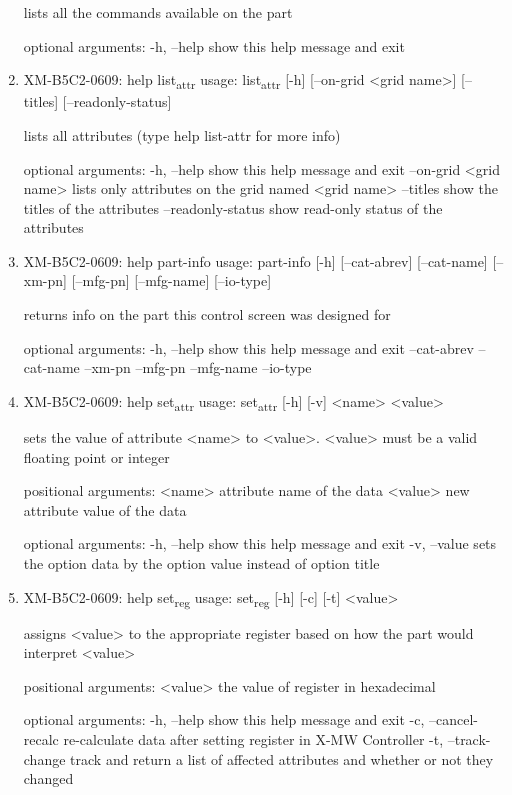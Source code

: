 \documentclass[11pt]{article}
\begin{document}
\begin{enumerate}
lists all the commands available on the part

optional arguments:
  -h, --help  show this help message and exit

\item XM-B5C2-0609: help list\textsubscript{attr}
\label{sec:orgfaa3866}
usage: list\textsubscript{attr} [-h] [--on-grid <grid name>] [--titles] [--readonly-status]

lists all attributes (type help list-attr for more info)

optional arguments:
  -h, --help            show this help message and exit
  --on-grid <grid name>
                        lists only attributes on the grid named <grid name>
  --titles              show the titles of the attributes
  --readonly-status     show read-only status of the attributes

\item XM-B5C2-0609: help part-info
\label{sec:org0cb66e5}
usage: part-info  [-h] [--cat-abrev] [--cat-name] [--xm-pn] [--mfg-pn] [--mfg-name]
        [--io-type]

returns info on the part this control screen was designed for

optional arguments:
  -h, --help   show this help message and exit
  --cat-abrev
  --cat-name
  --xm-pn
  --mfg-pn
  --mfg-name
  --io-type

\item XM-B5C2-0609: help set\textsubscript{attr}
\label{sec:orgaf9ae00}
usage: set\textsubscript{attr} [-h] [-v] <name> <value>

sets the value of attribute <name> to <value>. <value> must be a valid
floating point or integer

positional arguments:
  <name>       attribute name of the data
  <value>      new attribute value of the data

optional arguments:
  -h, --help   show this help message and exit
  -v, --value  sets the option data by the option value instead of option
               title

\item XM-B5C2-0609: help set\textsubscript{reg}
\label{sec:orgbdde637}
usage: set\textsubscript{reg} [-h] [-c] [-t] <value>

assigns <value> to the appropriate register based on how the part would
interpret <value>

positional arguments:
  <value>              the value of register in hexadecimal

optional arguments:
  -h, --help           show this help message and exit
  -c, --cancel-recalc  re-calculate data after setting register in X-MW
                       Controller
  -t, --track-change   track and return a list of affected attributes and
                       whether or not they changed


\end{enumerate}
\end{document}
